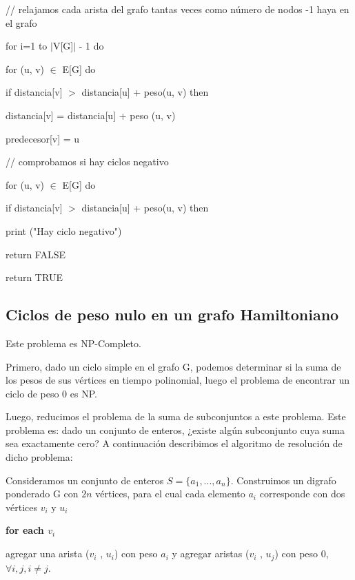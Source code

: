 \documentclass[a4paper,10pt]{article}
\begin{document}
\bigskip
\quad // relajamos cada arista del grafo tantas veces como número de nodos -1 haya en el grafo
       
\quad for i=1 to \(|\)V[G]\(|\) - 1 do
       
\quad\quad for (u, v) \(\in\)  E[G] do
       
\quad\quad\quad if distancia[v] \(>\) distancia[u] + peso(u, v) then
       
\quad\quad\quad\quad distancia[v] = distancia[u] + peso (u, v)
       
\quad\quad\quad\quad predecesor[v] = u

\bigskip       
\quad // comprobamos si hay ciclos negativo
       
\quad for (u, v) \(\in\) E[G] do
       
\quad\quad if distancia[v] \(>\) distancia[u] + peso(u, v) then
       
\quad\quad\quad print ("Hay ciclo negativo")
       
\quad\quad\quad return FALSE

\bigskip       
\quad return TRUE


\subsection{Ciclos de peso nulo en un grafo Hamiltoniano}

Este problema es NP-Completo.
 
Primero, dado un ciclo simple en el grafo G, podemos determinar si la suma de los pesos de sus vértices en tiempo polinomial, luego el problema de encontrar un ciclo de peso 0 es NP.

Luego, reducimos el problema de la suma de subconjuntos a este problema. Este problema es: dado un conjunto de enteros, ¿existe algún subconjunto cuya suma sea exactamente cero? A continuación describimos el algoritmo de resolución de dicho problema:

\bigskip

Consideramos un conjunto de enteros \( S = \{ a_{1}, . . . , a_{n} \}  \). Construimos un digrafo ponderado G con \( 2n \) vértices, para el cual cada elemento \( a_{i} \) corresponde con dos vértices \( v_{i} \) y \( u_{i} \)

\textbf{\textcolor[rgb]{0.0,0.5019608,0.0}{for each }}\( v_{i} \)

\quad agregar una arista (\( v_{i} \) , \( u_{i} \)) con peso \( a_{i} \) y agregar aristas (\( v_{i} \) , \( u_{j} \)) con peso 0, \( \forall i,j, i \neq j\).
\end{document}
